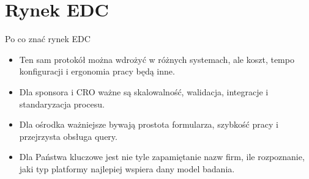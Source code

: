\section{Rynek EDC}


\begin{frame}{Po co znać rynek EDC}
  \begin{itemize}
    \item Ten sam protokół można wdrożyć w różnych systemach, ale koszt, tempo konfiguracji i ergonomia pracy będą inne.
    \item Dla sponsora i CRO ważne są skalowalność, walidacja, integracje i standaryzacja procesu.
    \item Dla ośrodka ważniejsze bywają prostota formularza, szybkość pracy i przejrzysta obsługa query.
    \item Dla Państwa kluczowe jest nie tyle zapamiętanie nazw firm, ile rozpoznanie, jaki typ platformy najlepiej wspiera dany model badania.
  \end{itemize}
\end{frame}

